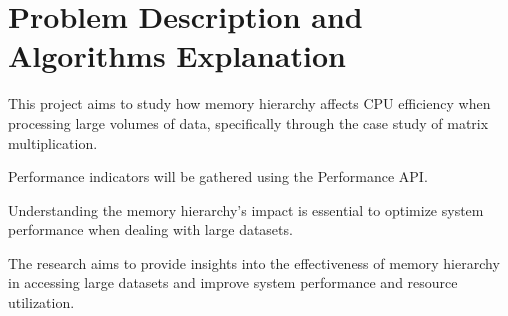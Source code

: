 \documentclass[10pt, titlepage]{extarticle}
\begin{document}
\begin{abstract}

    In this project, we'll look into how memory hierarchy affects CPU efficiency when processing big volumes of data.

    For that, we're using 3 different algorithms to multiply matrices, and we're comparing their performance. We explain each of the algorithm and how
    they work, on section \ref{Problem Description and Algorithms Explanation}.

    On section \ref{Performance metrics}, we present the harware counters, provided by the Performance API (PAPI), that we used to measure the performance
    of the algorithms, cache and cpu-wise. We also expalin what each of the counters means.

    We also evaluate each algorithm perfomance by measuring the time it takes to run: each one was run 12 times, and the best and worst results were discarded.
    There are clearly improvements in the perfomance of the second algorithm, compared to the first one, but the third one is the one that performs the best.

    On section \ref{FLOPS} we present the Floating Point Operations Per Second (FLOPS) of each algorithm, and on section \ref{Counters} we present the results of the counters.

    Finally, on section \ref{Conclusion}, we conclude the project.


\end{abstract}

\pagebreak
{}

\section{Problem Description and Algorithms Explanation}\label{Problem Description and Algorithms Explanation}

This project aims to study how memory hierarchy affects CPU efficiency when processing large volumes of data, specifically through
the case study of matrix multiplication.

Performance indicators will be gathered using the Performance API.

Understanding the memory hierarchy's impact is essential to optimize system performance when dealing with large datasets.

The research aims to provide insights into the effectiveness of memory hierarchy in accessing large datasets and improve system performance
and resource utilization.
\end{document}
